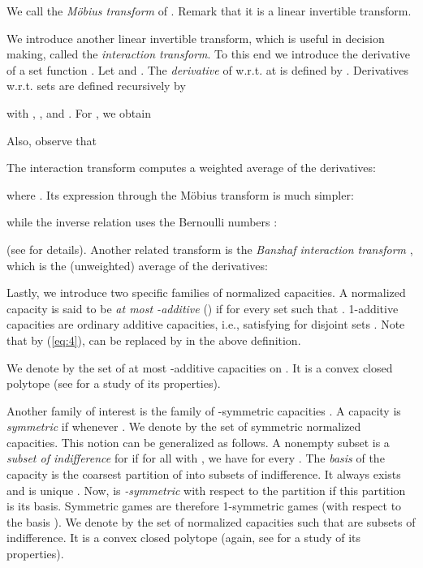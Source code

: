\documentclass[12pt,a4paper]{article}
\theoremstyle{definition}
\theoremstyle{remark}
\begin{document}
We call  the \textit{M\"obius transform} of . Remark that it is a linear invertible
transform.

We introduce another linear invertible transform, which is useful in decision
making, called the \textit{interaction transform}. To this end we introduce the
derivative of a set function . Let  and . The
\textit{derivative} of  w.r.t.  at  is defined by . Derivatives w.r.t. sets are defined recursively by

with , , and
. For , we obtain

 Also, observe that 

The interaction transform  computes a weighted
average of the derivatives:

where . Its expression through the M\"obius transform is much
simpler:

while the inverse relation uses the Bernoulli numbers :

(see \cite{degr96,grmaro99a} for details). Another related transform is the
\textit{Banzhaf interaction transform} , which is the
(unweighted) average of the derivatives:



\medskip

Lastly, we introduce two specific families of normalized capacities. A
normalized capacity  is said to be \textit{at most -additive}
() if  for every set  such that
 \cite{gra96f}. 1-additive capacities are ordinary additive capacities,
i.e., satisfying  for disjoint sets . Note that
by (\ref{eq:4}),  can be replaced by  in the above definition.

We denote by  the set of at most -additive capacities
on . It is a convex closed polytope (see \cite{micogi06} for a study of its properties).

Another family of interest is the family of -symmetric capacities
\cite{migrgi02}. A capacity  is \textit{symmetric} if 
whenever .  We denote by  the set of symmetric normalized
capacities. This notion can be generalized as follows. A nonempty subset
 is a \textit{subset of indifference} for  if for all
 with , we have 
for every . The \textit{basis} of the capacity is the
coarsest partition of  into subsets of indifference. It always exists and is
unique \cite{migr03a}. Now,  is \textit{-symmetric} with respect to the
partition  if this partition is its basis. Symmetric
games are therefore 1-symmetric games (with respect to the basis ). We
denote by  the set of normalized
capacities such that  are subsets of indifference. It is a
convex closed polytope (again, see \cite{micogi06} for a study of its properties).
\end{document}

